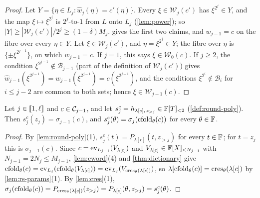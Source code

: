 \begin{proof}
Let $Y = \{\eta \in L_{j} : \hat w_j(\eta) = c'(\eta)\}$. Every $\xi \in \mathcal{W}_{j}(c')$ has $\xi^{2^j} \in Y$, and the map $\xi \mapsto \xi^{2^j}$ is $2^j$-to-$1$ from $L$ onto $L_j$ (\cref{lem:power}); so $|Y| \ge |\mathcal{W}_j(c')|/2^j \ge (1-\delta)M_j$.
 gives the first two claims, and $w_{j-1} = c$ on the fibre over every $\eta \in Y$.
Let $\xi \in \mathcal{W}_{j}(c')$, and $\eta = \xi^{2^j} \in Y$; the fibre over $\eta$ is $\{\pm \xi^{2^{j-1}}\}$, on which $w_{j-1} = c$.
If $j = 1$, this says $\xi \in \mathcal{W}_0(c)$.
If $j \ge 2$, the condition $\xi^{2^{j-1}} \notin \mathcal{B}_{j-1}$ (part of the definition of $\mathcal{W}_{j}(c')$) gives $\hat w_{j-1}(\xi^{2^{j-1}}) = w_{j-1}(\xi^{2^{j-1}}) = c(\xi^{2^{j-1}})$, and the conditions $\xi^{2^i} \notin \mathcal{B}_i$ for $i \le j-2$ are common to both sets; hence $\xi \in \mathcal{W}_{j-1}(c)$.
\end{proof}

\begin{lemma}\label{lem:rbr-restr}
Let $j \in \llbracket 1, \ell \rrbracket$ and $c \in \mathcal{C}_{j-1}$, and let $s^{c}_j = h_{\lambda[c],\, z_{>j}} \in \mathbb{F}[T]_{<2}$ (\cref{def:round-poly}).
Then $s^{c}_j(z_j) = \sigma_{j-1}(c)$, and $s^{c}_j(\theta) = \sigma_{j}(\mathrm{cfold}_\theta(c))$ for every $\theta \in \mathbb{F}$.
\end{lemma}

\begin{proof}
By \cref{lem:round-poly}(1), $s^c_j(t) = P_{\lambda[c]}(t, z_{>j})$ for every $t \in \mathbb{F}$; for $t = z_j$ this is $\sigma_{j-1}(c)$.
Since $c = \mathrm{ev}_{L_{j-1}}(V_{\lambda[c]})$ and $V_{\lambda[c]} \in \mathbb{F}[X]_{<N_{j-1}}$ with $N_{j-1} = 2N_j \le M_{j-1}$, \cref{lem:cword}(4) and \cref{thm:dictionary} give $\mathrm{cfold}_\theta(c) = \mathrm{ev}_{L_j}(\mathrm{cfold}_\theta(V_{\lambda[c]})) = \mathrm{ev}_{L_j}(V_{\mathrm{cres}_\theta(\lambda[c])})$, so $\lambda[\mathrm{cfold}_\theta(c)] = \mathrm{cres}_\theta(\lambda[c])$ by \cref{lem:rs-params}(1).
By \cref{lem:cres}(1), $\sigma_j(\mathrm{cfold}_\theta(c)) = P_{\mathrm{cres}_\theta(\lambda[c])}(z_{>j}) = P_{\lambda[c]}(\theta, z_{>j}) = s^c_j(\theta)$.
\end{proof}

